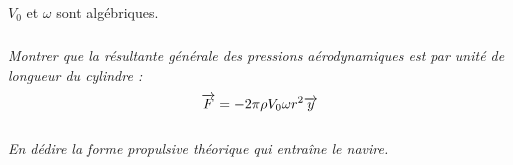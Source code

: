 \documentclass[10pt]{article}
\begin{document}
$V_0$ et $\omega$ sont algébriques.

\subparagraph{}
\textit{Montrer que la résultante générale des pressions aérodynamiques est par unité de longueur du cylindre :
$$
\overrightarrow{F}=-2\pi \rho  V_0 \omega r^2 \overrightarrow{y}
$$}

\subparagraph{}
\textit{En dédire la forme propulsive théorique qui entraîne le navire.}
\end{document}
